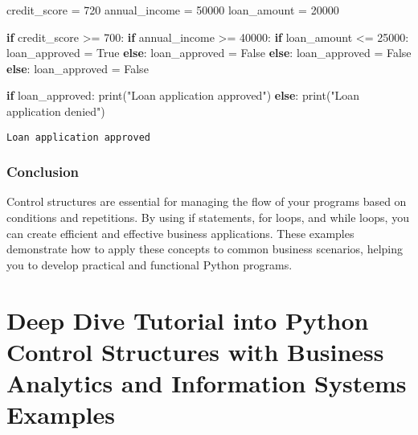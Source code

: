 \documentclass[
  letterpaper,
  DIV=11,
  numbers=noendperiod]{scrreprt}
\newenvironment{Shaded}{\begin{snugshade}}{\end{snugshade}}
\newcommand{\BuiltInTok}[1]{\textcolor[rgb]{0.00,0.23,0.31}{#1}}
\newcommand{\ControlFlowTok}[1]{\textcolor[rgb]{0.00,0.23,0.31}{\textbf{#1}}}
\newcommand{\DecValTok}[1]{\textcolor[rgb]{0.68,0.00,0.00}{#1}}
\newcommand{\NormalTok}[1]{\textcolor[rgb]{0.00,0.23,0.31}{#1}}
\newcommand{\OperatorTok}[1]{\textcolor[rgb]{0.37,0.37,0.37}{#1}}
\newcommand{\StringTok}[1]{\textcolor[rgb]{0.13,0.47,0.30}{#1}}
\newcommand{\VariableTok}[1]{\textcolor[rgb]{0.07,0.07,0.07}{#1}}
\begin{document}
\begin{Shaded}
\begin{Highlighting}[]
\NormalTok{credit\_score }\OperatorTok{=} \DecValTok{720}
\NormalTok{annual\_income }\OperatorTok{=} \DecValTok{50000}
\NormalTok{loan\_amount }\OperatorTok{=} \DecValTok{20000}

\ControlFlowTok{if}\NormalTok{ credit\_score }\OperatorTok{\textgreater{}=} \DecValTok{700}\NormalTok{:}
    \ControlFlowTok{if}\NormalTok{ annual\_income }\OperatorTok{\textgreater{}=} \DecValTok{40000}\NormalTok{:}
        \ControlFlowTok{if}\NormalTok{ loan\_amount }\OperatorTok{\textless{}=} \DecValTok{25000}\NormalTok{:}
\NormalTok{            loan\_approved }\OperatorTok{=} \VariableTok{True}
        \ControlFlowTok{else}\NormalTok{:}
\NormalTok{            loan\_approved }\OperatorTok{=} \VariableTok{False}
    \ControlFlowTok{else}\NormalTok{:}
\NormalTok{        loan\_approved }\OperatorTok{=} \VariableTok{False}
\ControlFlowTok{else}\NormalTok{:}
\NormalTok{    loan\_approved }\OperatorTok{=} \VariableTok{False}

\ControlFlowTok{if}\NormalTok{ loan\_approved:}
    \BuiltInTok{print}\NormalTok{(}\StringTok{"Loan application approved"}\NormalTok{)}
\ControlFlowTok{else}\NormalTok{:}
    \BuiltInTok{print}\NormalTok{(}\StringTok{"Loan application denied"}\NormalTok{)}
\end{Highlighting}
\end{Shaded}

\begin{verbatim}
Loan application approved
\end{verbatim}

\subsection{Conclusion}\label{conclusion-2}

Control structures are essential for managing the flow of your programs
based on conditions and repetitions. By using if statements, for loops,
and while loops, you can create efficient and effective business
applications. These examples demonstrate how to apply these concepts to
common business scenarios, helping you to develop practical and
functional Python programs.


\chapter{Deep Dive Tutorial into Python Control Structures with Business
Analytics and Information Systems
Examples}\label{deep-dive-tutorial-into-python-control-structures-with-business-analytics-and-information-systems-examples}
\end{document}
